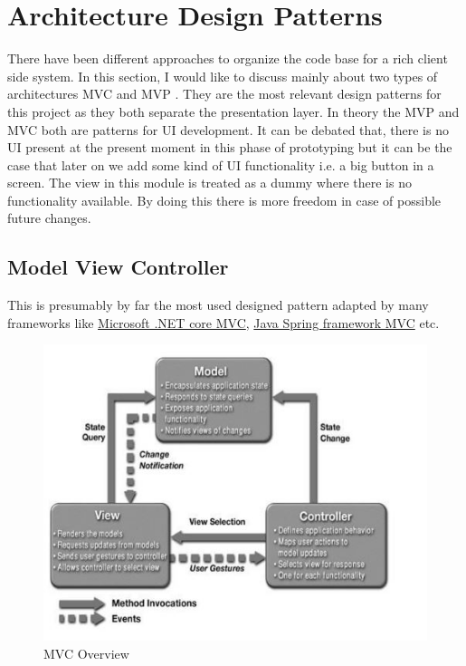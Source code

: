 \newpage
\section{Architecture Design Patterns}
    There have been different approaches to organize the code base for a rich client side 
    system. In this section, I would like to discuss mainly about two types of architectures
    MVC \cite{mvc} and MVP \cite{mvp}. They are the most relevant design patterns
    for this project as they both separate the presentation layer. 
    In theory the MVP and MVC both are patterns for UI development. It can
    be debated that, there is no UI present at the present moment in this phase of prototyping but
    it can be the case that later on we add some kind of UI functionality i.e. a big button in a
    screen. The view in this module is treated as a dummy where there is no functionality
    available. By doing this there is more freedom in case of possible future changes. 

    \subsection{Model View Controller}
        \label{ssec:mvc}
        This is presumably by far the most used designed pattern adapted by many frameworks like
        \href{https://docs.microsoft.com/en-us/aspnet/core/#build-web-apis-and-web-ui-using-aspnet-core-mvc}
        {Microsoft .NET core MVC}, \href{https://docs.spring.io/spring/docs/current/spring-framework-reference/web.html}
        {Java Spring framework MVC} etc. 

        \begin{figure}[htbp!]
            \centering \includegraphics{grafiken/mvc_hotop.jpg}
            \caption{MVC Overview \cite{Hotop2015}}
            \label{fig:mvcOverview}
        \end{figure}

